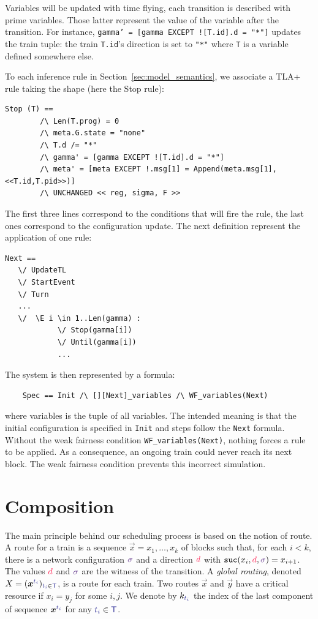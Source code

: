 \documentclass[runningheads]{llncs}
\newcommand{\sucblock}{{\mathtt{suc}}}
\newcommand{\dirFmt}[1]{{\color{dircolor} #1}}
\newcommand{\swFmt}[1]{{\color{swcolor}{#1}}}
\newcommand{\switches}{\ensuremath{\swFmt{\sigma}}}
\newcommand{\trainFmt}[1]{{\color{traincolor} #1}}
\newcommand{\trains}{{\trainFmt{\mathsf{T}}}}
\newcommand{\tid}[1]{\ensuremath{\trainFmt{t_{#1}}}}
\begin{document}
Variables will be updated with time flying, each transition is described with prime variables. Those latter represent the value of the variable after the transition. For instance, \texttt{gamma' = [gamma EXCEPT ![T.id].d = "*"]} updates the train tuple: the train \texttt{T.id}'s direction is set to \texttt{"*"} where  \texttt{T} is a variable  defined somewhere else. 

To each inference rule in Section~\ref{sec:model_semantics}, we associate a TLA+ rule taking the shape (here the Stop rule): 
\begin{verbatim}
Stop (T) ==
        /\ Len(T.prog) = 0
        /\ meta.G.state = "none"
        /\ T.d /= "*"
        /\ gamma' = [gamma EXCEPT ![T.id].d = "*"]
        /\ meta' = [meta EXCEPT !.msg[1] = Append(meta.msg[1],<<T.id,T.pid>>)]
        /\ UNCHANGED << reg, sigma, F >>
 \end{verbatim}
The first three lines correspond to the conditions that will fire the rule, the last ones correspond to the configuration update. The next definition represent the application of one rule:
\begin{verbatim}
Next == 
   \/ UpdateTL
   \/ StartEvent
   \/ Turn
   ...
   \/  \E i \in 1..Len(gamma) :
            \/ Stop(gamma[i])
            \/ Until(gamma[i])
            ...
\end{verbatim}       
        
The system is then represented by a formula:
\begin{verbatim}
    Spec == Init /\ [][Next]_variables /\ WF_variables(Next)
\end{verbatim}%
where variables is the tuple of all variables. The intended meaning is that the initial configuration is specified in \texttt{Init} and steps follow the \texttt{Next} formula.  Without the weak fairness condition \texttt{WF_variables(Next)},  nothing forces a rule to be applied. As a consequence, an ongoing train could never reach its next block. The weak fairness condition prevents this incorrect simulation. 

\section{Composition}
\label{sec:composition}

The main principle behind our scheduling process is based on the notion of route. A route for a train is a sequence $\vec{x} = x_1, \ldots, x_k$ of blocks such that, for each $i < k$, there is a network configuration $\switches$  and a direction $\dirFmt{d}$ with $\sucblock(x_i, \dirFmt{d}, \switches) = x_{i+1}$.  The values $\dirFmt{d}$ and $\switches$ are the witness of the transition. A \emph{global routing}, denoted $X = (\vec{x}^{\tid{i}})_{\tid{i} \in \trains}$, is a route for each train.  Two routes $\vec{x}$ and $\vec{y}$ have a critical resource if  $x_i = y_j$ for some $i,j$. We denote by $k_{\tid{i}}$ the index of the last component of sequence $\vec{x}^\tid{i}$ for any $\tid{i}\in \trains$. 
\end{document}
